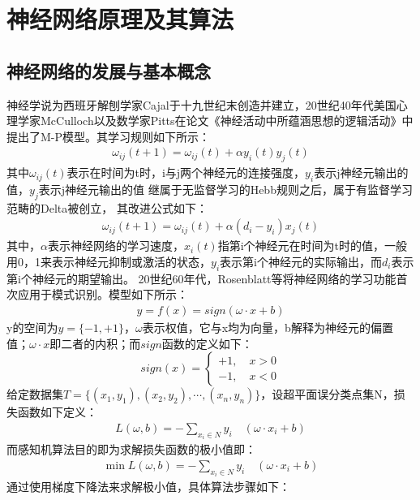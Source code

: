 \chapter{神经网络原理及其算法}

\section{神经网络的发展与基本概念}
神经学说为西班牙解刨学家Cajal于十九世纪末创造并建立，20世纪40年代美国心理学家McCulloch以及数学家Pitts在论文《神经活动中所蕴涵思想的逻辑活动》中提出了M-P模型。其学习规则如下所示：
\begin{align}
    \omega_{ij}(t+1) = \omega_{ij}(t)+\alpha y_i(t)y_j(t)
\end{align}
其中$\omega_{ij}(t)$表示在时间为t时，i与j两个神经元的连接强度，$y_i$表示j神经元输出的值，$y_j$表示j神经元输出的值
继属于无监督学习的Hebb规则之后，属于有监督学习范畴的Delta被创立，
其改进公式如下：
\begin{align}
    \omega_{ij}(t+1) = \omega_{ij}(t)+\alpha(d_i-y_i)x_j(t)
\end{align}
其中，$\alpha$表示神经网络的学习速度，$x_i(t)$指第i个神经元在时间为t时的值，一般用0，1来表示神经元抑制或激活的状态，$y_i$表示第i个神经元的实际输出，而$d_i$表示第i个神经元的期望输出。
20世纪60年代，Rosenblatt等将神经网络的学习功能首次应用于模式识别。模型如下所示：
\begin{align}
    y = f(x) = sign(\omega \cdot x + b)
\end{align}
y的空间为$y=\{-1,+1\}$，$\omega$表示权值，它与x均为向量，b解释为神经元的偏置值；$\omega \cdot x$即二者的内积；而$sign$函数的定义如下：
\begin{equation} 
     sign(x) = 
    \begin{cases}
        +1,\quad x > 0 \\
        -1,\quad x < 0
    \end{cases}
\end{equation}
给定数据集$T=\{(x_1,y_1),(x_2,y_2),\cdots,(x_n,y_n) \}$，设超平面误分类点集N，损失函数如下定义：
\begin{align}
    L(\omega,b) = -\sum_{x_i \in N} y_i \quad (\omega \cdot x_i + b)
\end{align}
而感知机算法目的即为求解损失函数的极小值即：
\begin{align}
    \min L(\omega,b) = -\sum_{x_i \in N} y_i \quad (\omega \cdot x_i + b)
\end{align}
通过使用梯度下降法来求解极小值，具体算法步骤如下：\\

